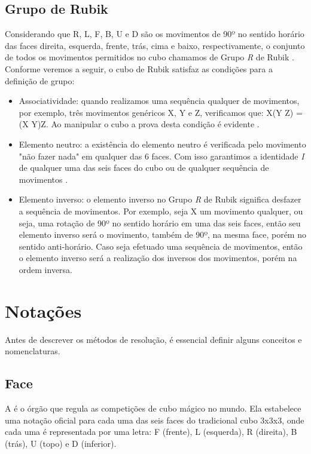 \subsection{Grupo de Rubik}
Considerando que R, L, F, B, U e D são os movimentos de 90º no sentido horário das faces direita, esquerda, frente, trás, cima e baixo, respectivamente, o conjunto de todos os movimentos permitidos no cubo chamamos de Grupo \textit{R} de Rubik \cite{luis}. Conforme veremos a seguir, o cubo de Rubik satisfaz as condições para a definição de grupo:

\begin{itemize}
    \item Associatividade: quando realizamos uma sequência qualquer de movimentos, por exemplo, três movimentos genéricos
X, Y e Z, verificamos que: X(Y Z) = (X Y)Z. Ao manipular o cubo a prova desta condição é evidente \cite{luis}.

    \item Elemento neutro: a existência do elemento neutro é verificada pelo movimento "não fazer nada" em qualquer das 6 faces. Com isso garantimos a identidade \textit{I} de qualquer uma das seis faces do cubo ou de qualquer sequência de movimentos \cite{luis}.
    
    \item Elemento inverso: o elemento inverso no Grupo \textit{R} de Rubik significa desfazer a sequência de movimentos. Por exemplo, seja X um movimento qualquer, ou seja, uma rotação de 90º no sentido horário em uma das seis faces, então seu elemento inverso será o movimento, também de 90º, na mesma face, porém no sentido anti-horário. Caso seja efetuado uma sequência de movimentos, então o elemento inverso será a realização dos inversos dos movimentos, porém na ordem inversa.
\end{itemize}


\section{Notações} 

Antes de descrever os métodos de resolução, é essencial definir alguns conceitos e nomenclaturas.


\subsection{Face} 
A é o órgão que regula as competições de cubo mágico no mundo. Ela estabelece uma notação oficial para cada uma das seis faces do tradicional cubo 3x3x3, onde cada uma é representada por uma letra: F (frente), L (esquerda), R (direita), B (trás), U (topo) e D (inferior).



